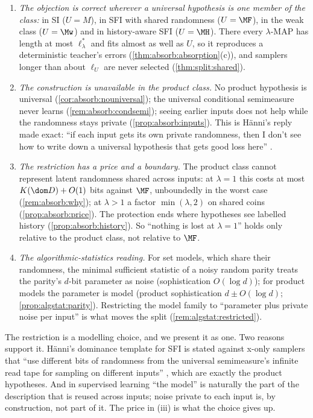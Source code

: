 \begin{remark}\label{rem:absorb:wyeth}
\begin{enumerate}[label=(\roman*)]
\item \emph{The objection is correct wherever a universal hypothesis is one member of the class:} in SI ($U=M$), in SFI with shared randomness ($U=\MF$), in the weak class ($U=\Mw$) and in history-aware SFI ($U=\MH$). There every $\lambda$-MAP has length at most $\ell^*_\lambda$ and fits almost as well as $U$, so it reproduces a deterministic teacher's errors (\cref{thm:absorb:absorption}(c)), and samplers longer than about $\ell_U$ are never selected (\cref{thm:split:shared}).
\item \emph{The construction is unavailable in the product class.} No product hypothesis is universal (\cref{cor:absorb:nouniversal}); the universal conditional semimeasure never learns (\cref{rem:absorb:condsemi}); seeing earlier inputs does not help while the randomness stays private (\cref{prop:absorb:inputs}). This is H\"anni's reply made exact: ``if each input gets its own private randomness, then I don't see how to write down a universal hypothesis that gets good loss here'' \citep{hanni2026lesswrong}.
\item \emph{The restriction has a price and a boundary.} The product class cannot represent latent randomness shared across inputs: at $\lambda=1$ this costs at most $K(\dom D)+O(1)$ bits against $\MF$, unboundedly in the worst case (\cref{rem:absorb:why}); at $\lambda>1$ a factor $\min(\lambda,2)$ on shared coins (\cref{prop:absorb:price}). The protection ends where hypotheses see labelled history (\cref{prop:absorb:history}). So ``nothing is lost at $\lambda=1$'' holds only relative to the product class, not relative to $\MF$.
\item \emph{The algorithmic-statistics reading.} For set models, which share their randomness, the minimal sufficient statistic of a noisy random parity treats the parity's $d$-bit parameter as noise (sophistication $O(\log d)$); for product models the parameter is model (product sophistication $d\pm O(\log d)$; \cref{prop:algstat:parity}). Restricting the model family to ``parameter plus private noise per input'' is what moves the split (\cref{rem:algstat:restricted}).
\end{enumerate}
The restriction is a modelling choice, and we present it as one. Two reasons support it. H\"anni's dominance template for SFI is stated against x-only samplers that ``use different bits of randomness from the universal semimeasure's infinite read tape for sampling on different inputs'' \citep{hanni2026notes}, which are exactly the product hypotheses. And in supervised learning ``the model'' is naturally the part of the description that is reused across inputs; noise private to each input is, by construction, not part of it. The price in (iii) is what the choice gives up.
\end{remark}

